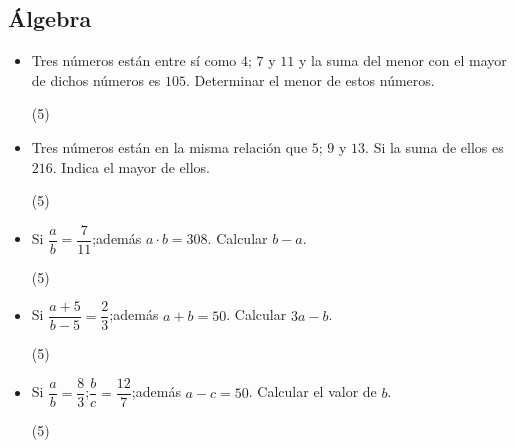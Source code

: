 \documentclass[10pt, twocolumn, landscape, a4paper]{article}
\begin{document}
\subsection*{Álgebra}
\begin{itemize}
\item{Tres números están entre sí como $4$; $7$ y $11$ y la suma del menor con el mayor de dichos números es $105$. Determinar el menor de estos números.
\begin{tasks}(5)
\end{tasks}
}
\item{Tres números están en la misma relación que $5$; $9$ y $13$. Si la suma de ellos es $216$. Indica el mayor de ellos.
\begin{tasks}(5)
\end{tasks}
}
\item{Si \quad$\dfrac{a}{b} = \dfrac{7}{11}$;\quad además \quad$a \cdot b = 308$. Calcular $b - a$. 
\begin{tasks}(5)
\end{tasks}
}
\item{Si \quad$\dfrac{a + 5}{b - 5} = \dfrac{2}{3}$;\quad además \quad$a + b = 50$. Calcular $3a - b$.
\begin{tasks}(5)
\end{tasks}
}
\item{Si \quad$\dfrac{a}{b} = \dfrac{8}{3}$;\quad $\dfrac{b}{c} = \dfrac{12}{7}$;\quad además \quad$a - c = 50$. Calcular el valor de $b$. 
\begin{tasks}(5)
\end{tasks}
}
\end{itemize}
\end{document}

